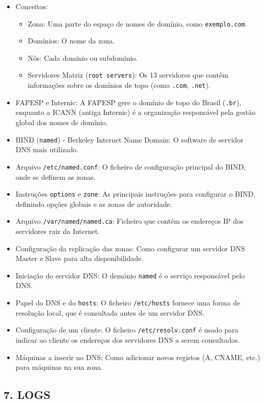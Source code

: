 \documentclass[10pt,a4paper]{article}
\begin{document}
		\begin{itemize}
			\item Conceitos:
			\begin{itemize}
				\item Zona: Uma parte do espaço de nomes de domínio, como \texttt{exemplo.com}.
				\item Domínios: O nome da zona.
				\item Nós: Cada domínio ou subdomínio.
				\item Servidores Matriz (\texttt{root servers}): Os 13 servidores que contêm informações sobre os domínios de topo (como \texttt{.com}, \texttt{.net}).
			\end{itemize}
			\item FAPESP e Internic: A FAPESP gere o domínio de topo do Brasil (\texttt{.br}), enquanto a ICANN (antiga Internic) é a organização responsável pela gestão global dos nomes de domínio.
			\item BIND (\texttt{named}) - Berkeley Internet Name Domain: O software de servidor DNS mais utilizado.
			\item Arquivo \texttt{/etc/named.conf}: O ficheiro de configuração principal do BIND, onde se definem as zonas.
			\item Instruções \texttt{options} e \texttt{zone}: As principais instruções para configurar o BIND, definindo opções globais e as zonas de autoridade.
			\item Arquivo \texttt{/var/named/named.ca}: Ficheiro que contém os endereços IP dos servidores raiz da Internet.
			\item Configuração da replicação das zonas: Como configurar um servidor DNS Master e Slave para alta disponibilidade.
			\item Iniciação do servidor DNS: O demónio \texttt{named} é o serviço responsável pelo DNS.
			\item Papel do DNS e do \texttt{hosts}: O ficheiro \texttt{/etc/hosts} fornece uma forma de resolução local, que é consultada antes de um servidor DNS.
			\item Configuração de um cliente: O ficheiro \texttt{/etc/resolv.conf} é usado para indicar ao cliente os endereços dos servidores DNS a serem consultados.
			\item Máquinas a inserir no DNS: Como adicionar novos registos (A, CNAME, etc.) para máquinas na sua zona.
		\end{itemize}
		
		\subsection*{7. LOGS}
		\vspace{-1.2em}
\end{document}
